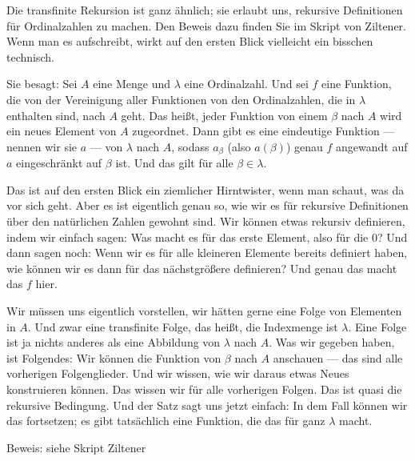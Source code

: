 \begin{spoken-clean}[00:29:30 - 00:31:30]
Die transfinite Rekursion ist ganz ähnlich; sie erlaubt uns, rekursive Definitionen für Ordinalzahlen zu machen. Den Beweis dazu finden Sie im Skript von Ziltener. Wenn man es aufschreibt, wirkt auf den ersten Blick vielleicht ein bisschen technisch.

Sie besagt: Sei $A$ eine Menge und $\lambda$ eine Ordinalzahl. Und sei $f$ eine Funktion, die von der Vereinigung aller Funktionen von den Ordinalzahlen, die in $\lambda$ enthalten sind, nach $A$ geht. Das heißt, jeder Funktion von einem $\beta$ nach $A$ wird ein neues Element von $A$ zugeordnet. Dann gibt es eine eindeutige Funktion --- nennen wir sie $a$ --- von $\lambda$ nach $A$, sodass $a_\beta$ (also $a(\beta)$) genau $f$ angewandt auf $a$ eingeschränkt auf $\beta$ ist. Und das gilt für alle $\beta \in \lambda$.
\end{spoken-clean}

\begin{spoken-clean}[00:31:30 - 00:33:40]
Das ist auf den ersten Blick ein ziemlicher Hirntwister, wenn man schaut, was da vor sich geht. Aber es ist eigentlich genau so, wie wir es für rekursive Definitionen über den natürlichen Zahlen gewohnt sind. Wir können etwas rekursiv definieren, indem wir einfach sagen: Was macht es für das erste Element, also für die $0$? Und dann sagen noch: Wenn wir es für alle kleineren Elemente bereits definiert haben, wie können wir es dann für das nächstgrößere definieren? Und genau das macht das $f$ hier.

Wir müssen uns eigentlich vorstellen, wir hätten gerne eine Folge von Elementen in $A$. Und zwar eine transfinite Folge, das heißt, die Indexmenge ist $\lambda$. Eine Folge ist ja nichts anderes als eine Abbildung von $\lambda$ nach $A$. Was wir gegeben haben, ist Folgendes: Wir können die Funktion von $\beta$ nach $A$ anschauen --- das sind alle vorherigen Folgenglieder. Und wir wissen, wie wir daraus etwas Neues konstruieren können. Das wissen wir für alle vorherigen Folgen. Das ist quasi die rekursive Bedingung. Und der Satz sagt uns jetzt einfach: In dem Fall können wir das fortsetzen; es gibt tatsächlich eine Funktion, die das für ganz $\lambda$ macht.
\end{spoken-clean}

\begin{math-stroke}

Beweis: siehe Skript Ziltener
\end{math-stroke}

